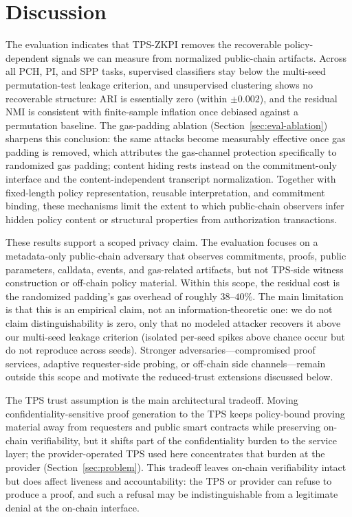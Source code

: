 \section{Discussion}
\label{sec:discussion}

The evaluation indicates that TPS-ZKPI removes the recoverable policy-dependent signals we can measure from normalized public-chain artifacts.
Across all PCH, PI, and SPP tasks, supervised classifiers stay below the multi-seed permutation-test
leakage criterion, and unsupervised clustering shows no recoverable structure: ARI is essentially zero (within $\pm 0.002$), and the residual NMI is consistent with finite-sample inflation once debiased against a permutation baseline.
The gas-padding ablation (Section~\ref{sec:eval-ablation}) sharpens this conclusion: the same attacks become measurably effective once gas padding is removed, which attributes the gas-channel protection specifically to randomized gas padding; content hiding rests instead on the commitment-only interface and the content-independent transcript normalization.
Together with fixed-length policy representation, reusable interpretation, and commitment
binding, these mechanisms limit the extent to which public-chain observers infer hidden policy content or structural properties from authorization transactions.

These results support a scoped privacy claim. The evaluation focuses on a metadata-only public-chain adversary that observes commitments, proofs, public parameters, calldata, events, and gas-related artifacts, but not TPS-side witness construction or off-chain policy material.
Within this scope, the residual cost is the randomized padding's gas overhead of roughly $38$--$40\%$.
The main limitation is that this is an empirical claim, not an information-theoretic one: we do not claim distinguishability is zero, only that no modeled attacker recovers it above our multi-seed leakage criterion (isolated per-seed spikes above chance occur but do not reproduce across seeds). Stronger adversaries---compromised proof services, adaptive requester-side probing, or off-chain side channels---remain outside this scope and motivate the reduced-trust extensions discussed below.

The TPS trust assumption is the main architectural tradeoff.
Moving confidentiality-sensitive proof generation to the TPS keeps policy-bound proving material away from requesters and public smart contracts while preserving on-chain verifiability, but it shifts part of the confidentiality burden to the service layer; the provider-operated TPS used here concentrates that burden at the provider (Section~\ref{sec:problem}).
This tradeoff leaves on-chain verifiability intact but does affect liveness and accountability: the TPS or provider can refuse to produce a proof, and such a refusal may be indistinguishable from a legitimate denial at the on-chain interface.

